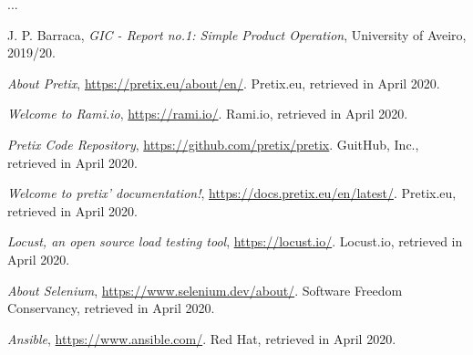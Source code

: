 \documentclass[12pt]{article}
\begin{document}
...

\begin{thebibliography}{9} %
  

    J. P. Barraca,
    \textit{GIC - Report no.1: Simple Product Operation},
    University of Aveiro,
    2019/20.

    \textit{About Pretix},
    \url{https://pretix.eu/about/en/}.
    Pretix.eu,
    retrieved in April 2020.

    \textit{Welcome to Rami.io},
    \url{https://rami.io/}.
    Rami.io,
    retrieved in April 2020.

    \textit{Pretix Code Repository},
    \url{https://github.com/pretix/pretix}.
    GuitHub, Inc.,
    retrieved in April 2020.

    \textit{Welcome to pretix' documentation!},
    \url{https://docs.pretix.eu/en/latest/}.
    Pretix.eu,
    retrieved in April 2020.



    \textit{Locust, an open source load testing tool},
    \url{https://locust.io/}.
    Locust.io,
    retrieved in April 2020.

    \textit{About Selenium},
    \url{https://www.selenium.dev/about/}.
    Software Freedom Conservancy,
    retrieved in April 2020.

    \textit{Ansible},
    \url{https://www.ansible.com/}.
    Red Hat,
    retrieved in April 2020.
    

\end{thebibliography}

\clearpage
\end{document}
